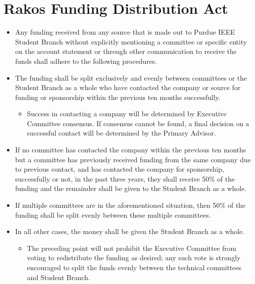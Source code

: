 \documentclass[12pt]{constitution}
\begin{document}
\section{Rakos Funding Distribution Act}
\label{sec:rakos_funding_distribution_act}
\begin{itemize}
    \item Any funding received from any source that is made out to Purdue IEEE Student Branch without explicitly mentioning a committee or specific entity on the account statement or through other communication to receive the funds shall adhere to the following procedures.
    \item The funding shall be split exclusively and evenly between committees or the Student Branch as a whole who have contacted the company or source for funding or sponsorship within the previous ten months successfully.
    \begin{itemize}
        \item Success in contacting a company will be determined by Executive Committee consensus. If consensus cannot be found, a final decision on a successful contact will be determined by the Primary Advisor.
    \end{itemize}
    \item If no committee has contacted the company within the previous ten months but a committee has previously received funding from the same company due to previous contact, and has contacted the company for sponsorship, successfully or not, in the past three years, they shall receive 50\% of the funding and the remainder shall be given to the Student Branch as a whole.
    \item If multiple committees are in the aforementioned situation, then 50\% of the funding shall be split evenly between these multiple committees.
    \item In all other cases, the money shall be given the Student Branch as a whole.
    \begin{itemize}
        \item The preceding point will not prohibit the Executive Committee from voting to redistribute the funding as desired; any such vote is strongly encouraged to split the funds evenly between the technical committees and Student Branch.
    \end{itemize}
\end{itemize}
\end{document}
